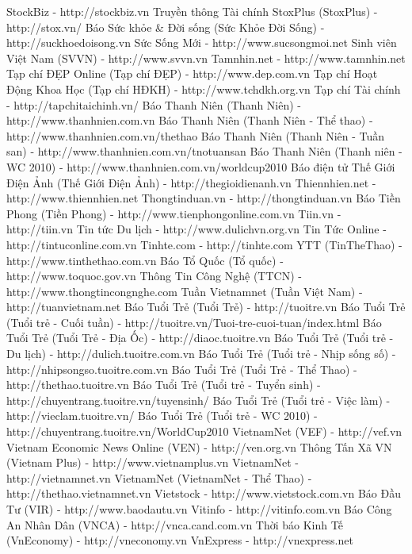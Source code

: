     StockBiz - http://stockbiz.vn
    Truyền thông Tài chính StoxPlus (StoxPlus) - http://stox.vn/
    Báo Sức khỏe & Đời sống (Sức Khỏe Đời Sống) - http://suckhoedoisong.vn
    Sức Sống Mới - http://www.sucsongmoi.net
    Sinh viên Việt Nam (SVVN) - http://www.svvn.vn
    Tamnhin.net - http://www.tamnhin.net
    Tạp chí ĐẸP Online (Tạp chí ĐẸP) - http://www.dep.com.vn
    Tạp chí Hoạt Động Khoa Học (Tạp chí HĐKH) - http://www.tchdkh.org.vn
    Tạp chí Tài chính - http://tapchitaichinh.vn/
    Báo Thanh Niên (Thanh Niên) - http://www.thanhnien.com.vn
    Báo Thanh Niên (Thanh Niên - Thể thao) - http://www.thanhnien.com.vn/thethao
    Báo Thanh Niên (Thanh Niên - Tuần san) - http://www.thanhnien.com.vn/tnotuansan
    Báo Thanh Niên (Thanh niên - WC 2010) - http://www.thanhnien.com.vn/worldcup2010
    Báo điện tử Thế Giới Điện Ảnh (Thế Giới Điện Ảnh) - http://thegioidienanh.vn
    Thiennhien.net - http://www.thiennhien.net
    Thongtinduan.vn - http://thongtinduan.vn
    Báo Tiền Phong (Tiền Phong) - http://www.tienphongonline.com.vn
    Tiin.vn - http://tiin.vn
    Tin tức Du lịch - http://www.dulichvn.org.vn
    Tin Tức Online - http://tintuconline.com.vn
    Tinhte.com - http://tinhte.com
    YTT (TinTheThao) - http://www.tinthethao.com.vn
    Báo Tổ Quốc (Tổ quốc) - http://www.toquoc.gov.vn
    Thông Tin Công Nghệ (TTCN) - http://www.thongtincongnghe.com
    Tuần Vietnamnet (Tuần Việt Nam) - http://tuanvietnam.net
    Báo Tuổi Trẻ (Tuổi Trẻ) - http://tuoitre.vn
    Báo Tuổi Trẻ (Tuổi trẻ - Cuối tuần) - http://tuoitre.vn/Tuoi-tre-cuoi-tuan/index.html
    Báo Tuổi Trẻ (Tuổi Trẻ - Địa Ốc) - http://diaoc.tuoitre.vn
    Báo Tuổi Trẻ (Tuổi trẻ - Du lịch) - http://dulich.tuoitre.com.vn
    Báo Tuổi Trẻ (Tuổi trẻ - Nhịp sống số) - http://nhipsongso.tuoitre.com.vn
    Báo Tuổi Trẻ (Tuổi Trẻ - Thể Thao) - http://thethao.tuoitre.vn
    Báo Tuổi Trẻ (Tuổi trẻ - Tuyển sinh) - http://chuyentrang.tuoitre.vn/tuyensinh/
    Báo Tuổi Trẻ (Tuổi trẻ - Việc làm) - http://vieclam.tuoitre.vn/
    Báo Tuổi Trẻ (Tuổi trẻ - WC 2010) - http://chuyentrang.tuoitre.vn/WorldCup2010
    VietnamNet (VEF) - http://vef.vn
    Vietnam Economic News Online (VEN) - http://ven.org.vn
    Thông Tấn Xã VN (Vietnam Plus) - http://www.vietnamplus.vn
    VietnamNet - http://vietnamnet.vn
    VietnamNet (VietnamNet - Thể Thao) - http://thethao.vietnamnet.vn
    Vietstock - http://www.vietstock.com.vn
    Báo Đầu Tư (VIR) - http://www.baodautu.vn
    Vitinfo - http://vitinfo.com.vn
    Báo Công An Nhân Dân (VNCA) - http://vnca.cand.com.vn
    Thời báo Kinh Tế (VnEconomy) - http://vneconomy.vn
    VnExpress - http://vnexpress.net
